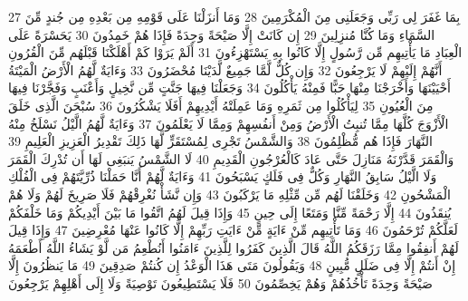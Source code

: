 \documentclass[20pt,a4paper]{article}
\begin{document}
{\tiny\colorbox{cl_aya}{27}} بِمَا غَفَرَ لِى رَبِّى وَجَعَلَنِى مِنَ الْمُكْرَمِينَ
{\tiny\colorbox{cl_aya}{28}} وَمَا أَنزَلْنَا عَلَى قَوْمِهِ مِن بَعْدِهِ مِن جُندٍ مِّنَ السَّمَاءِ وَمَا كُنَّا مُنزِلِينَ
{\tiny\colorbox{cl_aya}{29}} إِن كَانَتْ إِلَّا صَيْحَةً وَحِدَةً فَإِذَا هُمْ خَمِدُونَ
{\tiny\colorbox{cl_aya}{30}} يَحَسْرَةً عَلَى الْعِبَادِ مَا يَأْتِيهِم مِّن رَّسُولٍ إِلَّا كَانُوا بِهِ يَسْتَهْزِءُونَ
{\tiny\colorbox{cl_aya}{31}} أَلَمْ يَرَوْا كَمْ أَهْلَكْنَا قَبْلَهُم مِّنَ الْقُرُونِ أَنَّهُمْ إِلَيْهِمْ لَا يَرْجِعُونَ
{\tiny\colorbox{cl_aya}{32}} وَإِن كُلٌّ لَّمَّا جَمِيعٌ لَّدَيْنَا مُحْضَرُونَ
{\tiny\colorbox{cl_aya}{33}} وَءَايَةٌ لَّهُمُ الْأَرْضُ الْمَيْتَةُ أَحْيَيْنَهَا وَأَخْرَجْنَا مِنْهَا حَبًّا فَمِنْهُ يَأْكُلُونَ
{\tiny\colorbox{cl_aya}{34}} وَجَعَلْنَا فِيهَا جَنَّتٍ مِّن نَّخِيلٍ وَأَعْنَبٍ وَفَجَّرْنَا فِيهَا مِنَ الْعُيُونِ
{\tiny\colorbox{cl_aya}{35}} لِيَأْكُلُوا مِن ثَمَرِهِ وَمَا عَمِلَتْهُ أَيْدِيهِمْ أَفَلَا يَشْكُرُونَ
{\tiny\colorbox{cl_aya}{36}} سُبْحَنَ الَّذِى خَلَقَ الْأَزْوَجَ كُلَّهَا مِمَّا تُنبِتُ الْأَرْضُ وَمِنْ أَنفُسِهِمْ وَمِمَّا لَا يَعْلَمُونَ
{\tiny\colorbox{cl_aya}{37}} وَءَايَةٌ لَّهُمُ الَّيْلُ نَسْلَخُ مِنْهُ النَّهَارَ فَإِذَا هُم مُّظْلِمُونَ
{\tiny\colorbox{cl_aya}{38}} وَالشَّمْسُ تَجْرِى لِمُسْتَقَرٍّ لَّهَا ذَلِكَ تَقْدِيرُ الْعَزِيزِ الْعَلِيمِ
{\tiny\colorbox{cl_aya}{39}} وَالْقَمَرَ قَدَّرْنَهُ مَنَازِلَ حَتَّى عَادَ كَالْعُرْجُونِ الْقَدِيمِ
{\tiny\colorbox{cl_aya}{40}} لَا الشَّمْسُ يَنبَغِى لَهَا أَن تُدْرِكَ الْقَمَرَ وَلَا الَّيْلُ سَابِقُ النَّهَارِ وَكُلٌّ فِى فَلَكٍ يَسْبَحُونَ
{\tiny\colorbox{cl_aya}{41}} وَءَايَةٌ لَّهُمْ أَنَّا حَمَلْنَا ذُرِّيَّتَهُمْ فِى الْفُلْكِ الْمَشْحُونِ
{\tiny\colorbox{cl_aya}{42}} وَخَلَقْنَا لَهُم مِّن مِّثْلِهِ مَا يَرْكَبُونَ
{\tiny\colorbox{cl_aya}{43}} وَإِن نَّشَأْ نُغْرِقْهُمْ فَلَا صَرِيخَ لَهُمْ وَلَا هُمْ يُنقَذُونَ
{\tiny\colorbox{cl_aya}{44}} إِلَّا رَحْمَةً مِّنَّا وَمَتَعًا إِلَى حِينٍ
{\tiny\colorbox{cl_aya}{45}} وَإِذَا قِيلَ لَهُمُ اتَّقُوا مَا بَيْنَ أَيْدِيكُمْ وَمَا خَلْفَكُمْ لَعَلَّكُمْ تُرْحَمُونَ
{\tiny\colorbox{cl_aya}{46}} وَمَا تَأْتِيهِم مِّنْ ءَايَةٍ مِّنْ ءَايَتِ رَبِّهِمْ إِلَّا كَانُوا عَنْهَا مُعْرِضِينَ
{\tiny\colorbox{cl_aya}{47}} وَإِذَا قِيلَ لَهُمْ أَنفِقُوا مِمَّا رَزَقَكُمُ اللَّهُ قَالَ الَّذِينَ كَفَرُوا لِلَّذِينَ ءَامَنُوا أَنُطْعِمُ مَن لَّوْ يَشَاءُ اللَّهُ أَطْعَمَهُ إِنْ أَنتُمْ إِلَّا فِى ضَلَلٍ مُّبِينٍ
{\tiny\colorbox{cl_aya}{48}} وَيَقُولُونَ مَتَى هَذَا الْوَعْدُ إِن كُنتُمْ صَدِقِينَ
{\tiny\colorbox{cl_aya}{49}} مَا يَنظُرُونَ إِلَّا صَيْحَةً وَحِدَةً تَأْخُذُهُمْ وَهُمْ يَخِصِّمُونَ
{\tiny\colorbox{cl_aya}{50}} فَلَا يَسْتَطِيعُونَ تَوْصِيَةً وَلَا إِلَى أَهْلِهِمْ يَرْجِعُونَ
\end{document}
